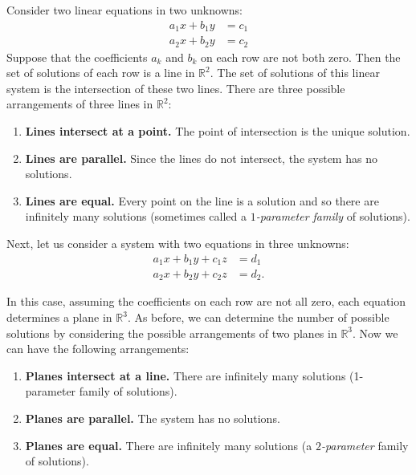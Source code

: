 \documentclass[12pt, a4paper]{article}
\theoremstyle{definition}
\theoremstyle{plain}
\newcommand{\bb}[1]{\mathbb{#1}}
\begin{document}
Consider two linear equations in two unknowns: 
$$\begin{aligned}
a_1x+b_1y&=c_1 \\
a_2x+b_2y&=c_2
\end{aligned}$$
Suppose that the coefficients $a_k$ and $b_k$ on each row are not both zero. Then the set of solutions of each row is a line in $\bb{R}^2.$ The set of solutions of this linear system is the intersection of these two lines. There are three possible arrangements of three lines in $\bb{R}^2$:

\begin{enumerate}
	
	\item \textbf{Lines intersect at a point.} The point of intersection is the unique solution.

	\item \textbf{Lines are parallel.} Since the lines do not intersect, the system has no solutions.

	\item \textbf{Lines are equal.} Every point on the line is a solution and so there are infinitely many solutions (sometimes called a \textit{$1$-parameter family} of solutions).

\end{enumerate}

Next, let us consider a system with two equations in three unknowns:
$$\begin{aligned}
a_1x + b_1y + c_1z &= d_1 \\
a_2x + b_2y + c_2z &= d_2.
\end{aligned}$$

In this case, assuming the coefficients on each row are not all zero, each equation determines a plane in $\bb{R}^3.$ As before, we can determine the number of possible solutions by considering the possible arrangements of two planes in $\bb{R}^3.$ Now we can have the following arrangements:

\begin{enumerate}
	
	\item \textbf{Planes intersect at a line.} There are infinitely many solutions (1-parameter family of solutions).

	\item \textbf{Planes are parallel.} The system has no solutions.

	\item \textbf{Planes are equal.} There are infinitely many solutions (a \textit{$2$-parameter} family of solutions).

\end{enumerate}
\end{document}
